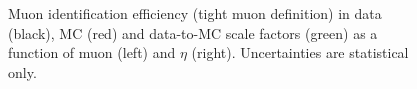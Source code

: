\begin{figure}[htbp!]
  \begin{center}
      \caption{Muon identification efficiency (tight muon definition) in data (black), MC (red) and data-to-MC
        scale factors (green) as a function of muon \pt (left) and $\eta$ (right). Uncertainties are statistical only.}
\label{fig:muonEff_ID}
  \end{center}
\end{figure}


